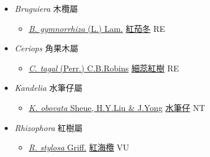 
  \begin{itemize}
 \item[] \textit{Bruguiera} 木欖屬
                    
  \begin{itemize}
        \item[] \href{http://www.theplantlist.org/tpl1.1/search?q=Bruguiera+gymnorrhiza}{\textit{B. gymnorrhiza} (L.) Lam.}   \href{\detokenize{http://taibnet.sinica.edu.tw/chi/taibnet_species_list.php?T2=紅茄冬&T2_new_value=true&fr=y}}{紅茄冬} RE
  \end{itemize}
 \item[] \textit{Ceriops} 角果木屬
                    
  \begin{itemize}
        \item[] \href{http://www.theplantlist.org/tpl1.1/search?q=Ceriops+tagal}{\textit{C. tagal} (Perr.) C.B.Robins}   \href{\detokenize{http://taibnet.sinica.edu.tw/chi/taibnet_species_list.php?T2=細蕊紅樹&T2_new_value=true&fr=y}}{細蕊紅樹} RE
  \end{itemize}
 \item[] \textit{Kandelia} 水筆仔屬
                    
  \begin{itemize}
        \item[] \href{http://www.theplantlist.org/tpl1.1/search?q=Kandelia+obovata}{\textit{K. obovata} Sheue, H.Y.Liu \& J.Yong}   \href{\detokenize{http://taibnet.sinica.edu.tw/chi/taibnet_species_list.php?T2=水筆仔&T2_new_value=true&fr=y}}{水筆仔} NT
  \end{itemize}
 \item[] \textit{Rhizophora} 紅樹屬
                    
  \begin{itemize}
        \item[] \href{http://www.theplantlist.org/tpl1.1/search?q=Rhizophora+stylosa}{\textit{R. stylosa} Griff.}   \href{\detokenize{http://taibnet.sinica.edu.tw/chi/taibnet_species_list.php?T2=紅海欖&T2_new_value=true&fr=y}}{紅海欖} VU
  \end{itemize}
  \end{itemize}
